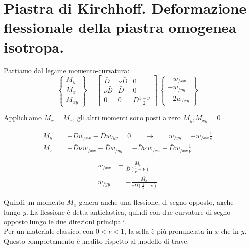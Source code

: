\section{Piastra di Kirchhoff. Deformazione flessionale della piastra omogenea isotropa.}

Partiamo dal legame momento-curvatura:
\begin{equation*}
\left\{
\begin{array}{c}
M_y \\
M_x\\
M_{xy}
\end{array}
\right\} =
\left[
\begin{array}{ccc}
\displaystyle \bar{D} & \displaystyle \nu\bar{D} & \displaystyle 0\\
\displaystyle \nu\bar{D} & \displaystyle \bar{D} & \displaystyle 0 \\
\displaystyle 0& \displaystyle 0 & \displaystyle \bar{D}\frac{1-\nu}{2}
\end{array}
\right]\,
\left\{
\begin{array}{c}
-w_{/xx} \\
-w_{/yy}\\
-2w_{/xy}
\end{array}
\right\} 
\end{equation*}

Applichiamo $M_x=\bar{M_x}$, gli altri momenti sono posti a zero $M_y,M_{xy}=0$

\begin{align*}
    M_y&=-\bar{D}w_{/xx}-\bar{D}w_{/yy}=0\qquad \rightarrow\qquad w_{/yy}=-w_{/xx}\frac{1}{\nu}\\
    M_x&=-\bar{D}\nu \,w_{/xx}-\bar{D}w_{/yy}=  -\bar{D}\nu \,w_{/xx}+\bar{D}w_{/xx}\frac{1}{\nu}\\
\end{align*}
\begin{align*}
   w_{/xx}&=\frac{\bar{M_x}}{\bar{D}\left(\frac{1}{\nu}-\nu\right)}\\
   w_{/yy}&=-\frac{\bar{M_x}}{\nu\bar{D}\left(\frac{1}{\nu}-\nu\right)}
\end{align*}

Quindi un momento $M_x$ genera anche una flessione, di segno opposto, anche lungo $y$. La flessione è detta anticlastica, quindi con due curvature di segno opposto lungo le due direzioni principali.\\
Per un materiale classico, con $0<\nu<1 $, la sella è più pronunciata in $x$ che in $y$. Questo comportamento è inedito rispetto al modello di trave.


